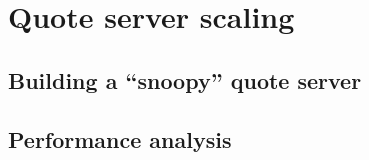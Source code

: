 \section{Quote server scaling}

\subsection{Building a ``snoopy'' quote server}

\subsection{Performance analysis}